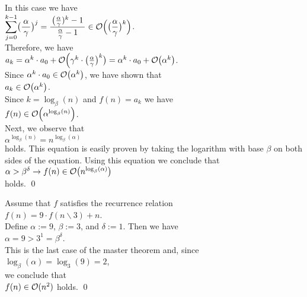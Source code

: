 \begin{enumerate}
      In this case we have
      \\[0.2cm]
      \hspace*{1.3cm}
      $\ds\sum\limits_{j=0}^{k-1} \bigl(\frac{\,\alpha\,}{\gamma}\bigr)^j = \bruch{\bigl(\frac{\alpha}{\gamma})^k - 1}{\frac{\alpha}{\gamma} - 1} \in \Oh\Bigl(\bigl(\frac{\alpha}{\gamma}\bigr)^k\Bigr)$.
      \\[0.2cm]
      Therefore, we have
      \\[0.2cm]
      \hspace*{1.3cm}
      $a_k = \alpha^k\cdot a_0 + \mathcal{O}\Bigl(\gamma^k \cdot \bigl(\frac{\alpha}{\gamma}\bigr)^k\bigr) = \alpha^k\cdot a_0 + \mathcal{O}\bigl(\alpha^k\bigr)$.
      \\[0.2cm] 
      Since $\alpha^k \cdot a_0 \in \mathcal{O}\bigl(\alpha^k\bigr)$, we have shown that
      \\[0.2cm]
      \hspace*{1.3cm}
      $a_k \in  \mathcal{O}\bigl(\alpha^k\bigr)$.
      \\[0.2cm]
      Since  $k = \log_{\beta}(n)$ and $f(n) = a_k$ we have
      \\[0.2cm]
      \hspace*{1.3cm}
      $f(n) \in \mathcal{O}\Bigl(\alpha^{\log_{\beta}(n)}\Bigr)$.
      \\[0.2cm] 
      Next, we observe that 
      \\[0.2cm]
      \hspace*{1.3cm}
      $\alpha^{\log_{\beta}(n)} = n^{\log_{\beta}(\alpha)}$
      \\[0.2cm]
      holds.   This equation is easily proven by taking the logarithm with base $\beta$ on both sides
      of the equation.  Using this equation we conclude that
      \\[0.2cm]
      \hspace*{1.3cm}
      $\alpha > \beta^\delta \rightarrow f(n) \in \mathcal{O}\bigl(n^{\log_{\beta}(\alpha)}\bigr)$
      \\[0.2cm]
      holds.  \qed
\end{enumerate}


\example
Assume that $f$ satisfies the recurrence relation
\\[0.2cm]
\hspace*{1.3cm}
$f(n) = 9 \cdot f(n \backslash 3) + n$.
\\[0.2cm] 
Define $\alpha := 9$, $\beta := 3$, and $\delta := 1$.
Then we have
\\[0.2cm]
\hspace*{1.3cm}
$\alpha = 9 > 3^1 = \beta^\delta$.
\\[0.2cm] 
This is the last case of the master theorem and, since 
\\[0.2cm]
\hspace*{1.3cm}
$\log_{\beta}(\alpha) = \log_3(9) = 2$,
\\[0.2cm]
we conclude that
\\[0.2cm]
\hspace*{1.3cm}
$f(n) \in \mathcal{O}(n^2)$ \quad holds.
 \qed


